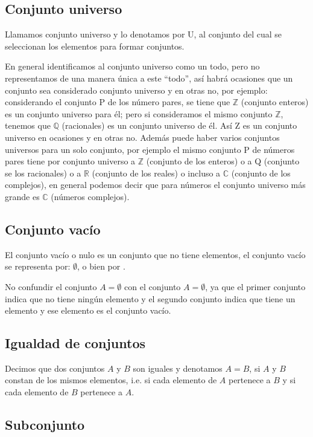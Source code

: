 \subsection{Conjunto universo}
Llamamos conjunto universo y lo denotamos por U, al conjunto del cual se
seleccionan los elementos para formar conjuntos.

En general identificamos al conjunto universo como un todo, pero no
representamos de una manera única a este “todo”, así habrá ocasiones que un
conjunto sea considerado conjunto universo y en otras no, por ejemplo:
considerando el conjunto P de los número pares, se tiene que $\mathbb Z$
(conjunto enteros) es un conjunto universo para él; pero si consideramos el
mismo conjunto $\mathbb Z$, tenemos que $\mathbb Q$ (racionales) es un conjunto
universo de él. Así Z es un conjunto universo en ocasiones y en otras no. Además
puede haber varios conjuntos universos para un solo conjunto, por ejemplo el
mismo conjunto P de números pares tiene por conjunto universo a $\mathbb Z$
(conjunto de los enteros) o a Q (conjunto se los racionales) o a $\mathbb R$
(conjunto de los reales) o incluso a $\mathbb C$ (conjunto de los complejos), en
general podemos decir que para números el conjunto universo más grande es
$\mathbb C$ (números complejos).

\subsection{Conjunto vacío}

El conjunto vacío o nulo es un conjunto que no tiene elementos, el conjunto
vacío se representa por: $\emptyset$, o bien por {}.

No confundir el conjunto $A = \emptyset $ con el conjunto $ A = {\emptyset} $,
ya que el primer conjunto indica que no tiene ningún elemento y el segundo
conjunto indica que tiene un elemento y ese elemento es el conjunto vacío.

\subsection{Igualdad de conjuntos}

Decimos que dos conjuntos $A$ y $B$ son iguales y denotamos $A=B$, si $A$ y $B$
constan de los mismos elementos, i.e. si cada elemento de $A$ pertenece a $B$ y
si cada elemento de $B$ pertenece a $A$.

\subsection{Subconjunto}

